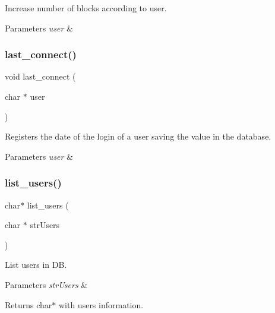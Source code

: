 Increase number of blocks according to user. 


\begin{DoxyParams}{Parameters}
{\em user} & \\
\hline
\end{DoxyParams}
\mbox{\label{auth_8h_a45125798b5e6b7446e4f699ff5d5ce7e}} 
\subsubsection{last\+\_\+connect()}
{\footnotesize\ttfamily void last\+\_\+connect (\begin{DoxyParamCaption}\item[{char $\ast$}]{user }\end{DoxyParamCaption})}



Registers the date of the login of a user saving the value in the database. 


\begin{DoxyParams}{Parameters}
{\em user} & \\
\hline
\end{DoxyParams}
\mbox{\label{auth_8h_a56c464f7248b65a5b16a96f3d5cb94af}} 
\subsubsection{list\+\_\+users()}
{\footnotesize\ttfamily char$\ast$ list\+\_\+users (\begin{DoxyParamCaption}\item[{char $\ast$}]{str\+Users }\end{DoxyParamCaption})}



List users in DB. 


\begin{DoxyParams}{Parameters}
{\em str\+Users} & \\
\hline
\end{DoxyParams}
\begin{DoxyReturn}{Returns}
char$\ast$ with users information. 
\end{DoxyReturn}
\mbox{\label{auth_8h_aca138a298c612a14d6fb2c16672f8c87}} 
